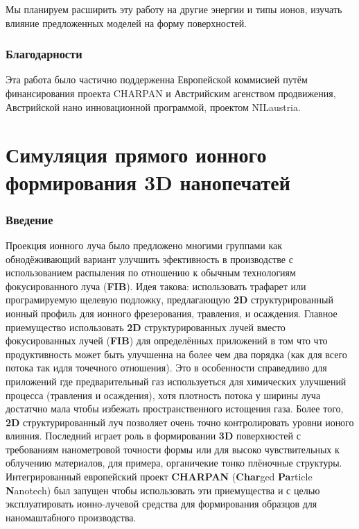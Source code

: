 \documentclass[a4paper,fontsize=12pt]{article}
\begin{document}
Мы планируем расширить эту работу на другие энергии и типы ионов, изучать влияние предложенных моделей на форму поверхностей.

\section{Благодарности}

Эта работа было частично поддерженна Европейской коммисией путём финансирования проекта CHARPAN и Австрийским агенством продвижения, Австрийской нано инновационной программой, проектом NILaustria.


%
%

\newcommand{\fib}{(\textbf{\uppercase{fib}})}

\newcommand{\dd}{\textbf{\uppercase{2d}}}
\newcommand{\dt}{\textbf{\uppercase{3d}}}

\newcommand{\desccharpan}{\textbf{\uppercase{charpan}} (\textbf{Char}ged \textbf{Pa}rticle \textbf{N}anotech)}
\newcommand{\charpan}{\textbf{\uppercase{char\-pan}}}

\newcommand{\ion}{$IonShaper^{®}$}


\part{Симуляция прямого ионного формирования \dt{} нанопечатей}


\section{Введение}

Проекция ионного луча было предложено многими группами как обнодёживающий вариант улучшить эфективность в производстве с использованием распыления по отношению к обычным технологиям фокусированного луча \fib{}. Идея такова: использовать трафарет или програмируемую щелевую подложку, предлагающую \dd{} структурированный ионный профиль для ионного фрезерования, травления, и осаждения. Главное приемущество использовать \dd{} структурированных лучей вместо фокусированных лучей \fib{} для определённых приложений в том что что продуктивность может быть улучшенна на более чем два порядка (как для всего потока так идля точечного отношения). Это в особенности справедливо для приложений где предварительный газ используеться для химических улучшений процесса (травления и осаждения), хотя плотность потока у ширины луча достатчно мала чтобы избежать пространственного истощения газа. Более того, \dd{} структурированный луч позволяет очень точно контролировать уровни ионого влияния. Последний играет роль в формировании \dt{} поверхностей с требованиям нанометровой точности формы или для высоко чувствительных к облучению материалов, для примера, органичекие тонко плёночные структуры. Интегрированный европейский проект \desccharpan{} был запущен чтобы использовать эти приемущества и с целью эксплуатировать ионно-лучевой средства для формирования образцов для наномаштабного производства.
\end{document}
